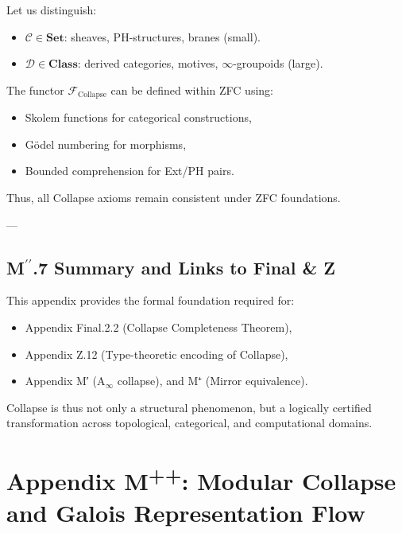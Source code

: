 \documentclass[11pt]{article}
\begin{document}
\begin{axiom}
\begin{axiom}
{{Let us distinguish:
\begin{itemize}
  \item $\mathcal{C} \in \mathbf{Set}$: sheaves, PH-structures, branes (small).
  \item $\mathcal{D} \in \mathbf{Class}$: derived categories, motives, $\infty$-groupoids (large).
\end{itemize}

\begin{proposition}
The functor $\mathcal{F}_{\text{Collapse}}$ can be defined within ZFC using:
\begin{itemize}
  \item Skolem functions for categorical constructions,
  \item Gödel numbering for morphisms,
  \item Bounded comprehension for Ext/PH pairs.
\end{itemize}
Thus, all Collapse axioms remain consistent under ZFC foundations.
\end{proposition}

---

\subsection*{M$^{\prime\prime}$.7 Summary and Links to Final \& Z}

This appendix provides the formal foundation required for:

\begin{itemize}
  \item Appendix Final.2.2 (Collapse Completeness Theorem),
  \item Appendix Z.12 (Type-theoretic encoding of Collapse),
  \item Appendix M′ (A$_\infty$ collapse), and M⁺ (Mirror equivalence).
\end{itemize}

Collapse is thus not only a structural phenomenon,  
but a logically certified transformation across topological, categorical, and computational domains.




\section*{Appendix M\textsuperscript{++}: Modular Collapse and Galois Representation Flow}

}}
\end{axiom}
\end{axiom}
\end{document}
